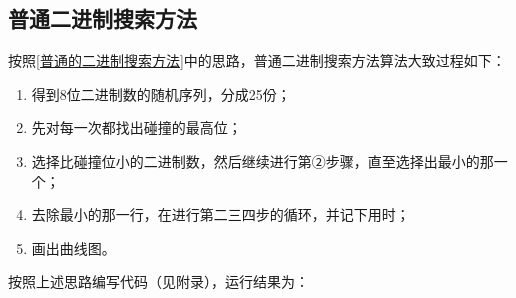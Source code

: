\documentclass[a4paper]{ctexart}
\begin{document}
\subsection{普通二进制搜索方法}
按照\ref{普通的二进制搜索方法}中的思路，普通二进制搜索方法算法大致过程如下：
\begin{enumerate}
	\item 得到8位二进制数的随机序列，分成25份；
	\item 先对每一次都找出碰撞的最高位；
	\item 选择比碰撞位小的二进制数，然后继续进行第②步骤，直至选择出最小的那一个；
	\item 去除最小的那一行，在进行第二三四步的循环，并记下用时；
	\item 画出曲线图。
\end{enumerate}
按照上述思路编写代码（见附录），运行结果为：
\end{document}
